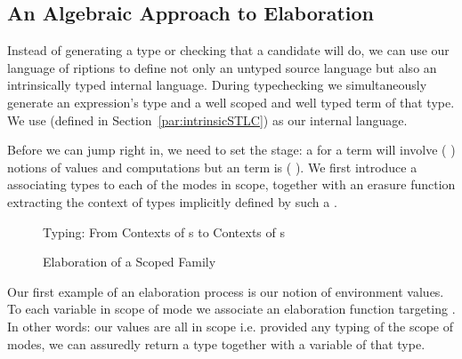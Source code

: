 \subsection{An Algebraic Approach to Elaboration}\label{section:elaboration}

Instead of generating a type or checking that a candidate will do, we
can use our language of riptions to define not only an
untyped source language but also an intrinsically typed internal
language. During typechecking we simultaneously generate an
expression's type and a well scoped and well typed term of that
type. We use  (defined in Section~\ref{par:intrinsicSTLC}) as
our internal language.

Before we can jump right in, we need to set the stage: a  for a
 term will involve ({ }) notions of values and
computations but an  term is ({ }). We first
introduce a  associating types to each of the modes in scope,
together with an erasure function  extracting the context of types
implicitly defined by such a .

\begin{figure}[h]
\begin{minipage}[t]{0.4\textwidth}
\end{minipage}
\begin{minipage}[t]{0.5\textwidth}
\end{minipage}
\caption{Typing: From Contexts of s to Contexts of s\label{fig:typingmodes}}
\end{figure}


\begin{figure}[H]
\caption{Elaboration of a Scoped Family}
\end{figure}

Our first example of an elaboration process is our notion of environment values.
To each variable in scope of mode  we associate an elaboration function
targeting . In other words: our values are all in scope i.e. provided any
typing of the scope of modes, we can assuredly return a type together with a
variable of that type.

